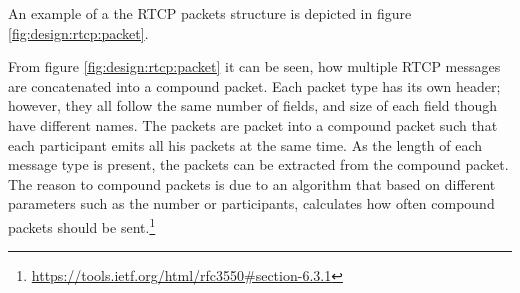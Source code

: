 An example of a the RTCP packets structure is depicted in figure \ref{fig:design:rtcp:packet}.

From figure \ref{fig:design:rtcp:packet} it can be seen, how multiple RTCP messages are concatenated into a compound packet. Each packet type has its own header; however, they all follow the same number of fields, and size of each field though have different names. The packets are packet into a compound packet such that each participant emits all his packets at the same time. As the length of each message type is present, the packets can be extracted from the compound packet. The reason to compound packets is due to an algorithm that based on different parameters such as the number or participants, calculates how often compound packets should be sent.\footnote{\url{https://tools.ietf.org/html/rfc3550\#section-6.3.1}}


